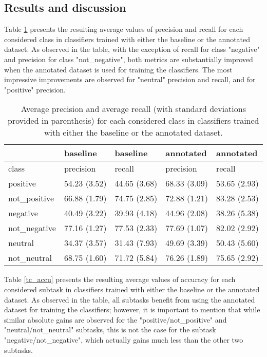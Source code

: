 \subsection{Results and discussion}
Table \ref{tc_pre_rec} presents the resulting average values of precision and recall for each considered class 
in classifiers trained with either the baseline or the annotated dataset. As observed in the table, with the
exception of recall for class "negative" and precision for class "not_negative", both metrics are substantially 
improved when the annotated dataset is used for training the classifiers. The most impressive improvements
are observed for "neutral" precision and recall, and for "positive" precision. 

\begin{table}
\begin{tabular}{|l|l|l|l|l|}
\hline
&baseline &baseline &annotated &annotated \\ 
\hline
class &precision &recall &precision &recall \\ 
\hline
positive &54.23 (3.52) &44.65 (3.68) &68.33 (3.09) &53.65 (2.93) \\ 
\hline
not_positive &66.88 (1.79) &74.75 (2.85) &72.88 (1.21) &83.28 (2.53) \\ 
\hline
negative &40.49 (3.22) &39.93 (4.18) &44.96 (2.08) &38.26 (5.38) \\ 
\hline
not_negative &77.16 (1.27) &77.53 (2.33) &77.69 (1.07) &82.02 (2.92) \\ 
\hline
neutral &34.37 (3.57) &31.43 (7.93) &49.69 (3.39) &50.43 (5.60) \\ 
\hline
not_neutral &68.75 (1.60) &71.72 (5.84) &76.26 (1.89) &75.65 (2.92) \\ 
\hline
\end{tabular}
\caption{Average precision and average recall (with standard deviations provided in parenthesis) 
for each considered class in classifiers trained with either the baseline or the annotated dataset.}
\label{tc_pre_rec}
\end{table}

Table \ref{tc_accu} presents the resulting average values of accuracy for each considered subtask 
in classifiers trained with either the baseline or the annotated dataset. As observed in the table,
all subtasks benefit from using the annotated dataset for training the classifiers; however, it is 
important to mention that while similar absolute gains are observed for the "positive/not_positive" and "neutral/not_neutral"
subtasks, this is not the case for the subtask "negative/not_negative", which actually gains much less than the other
two subtasks.

